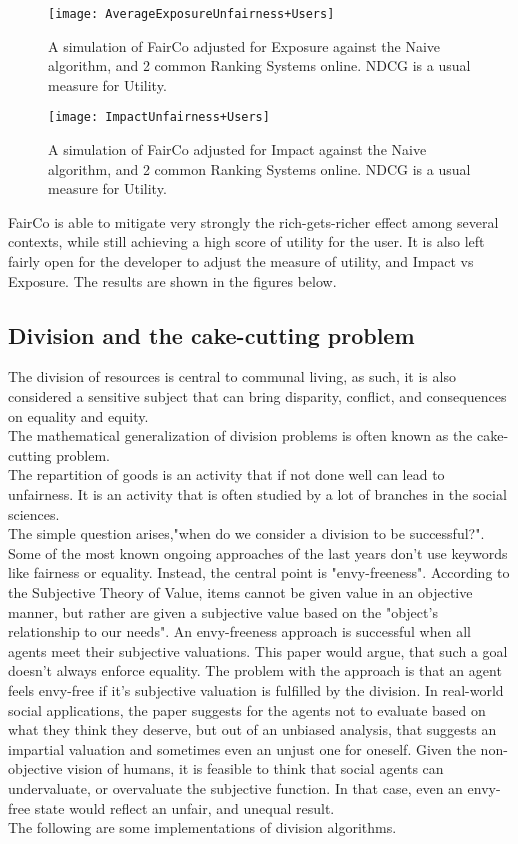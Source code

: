\begin{figure}[h]
  \texttt{[image: AverageExposureUnfairness+Users]}
  \caption{A simulation of FairCo adjusted for Exposure against the Naive algorithm, and 2 common Ranking Systems online. NDCG is a usual measure for Utility.}
  \cite{MSHJ20}
  \texttt{[image: ImpactUnfairness+Users]}
  \caption{A simulation of FairCo adjusted for Impact against the Naive algorithm, and 2 common Ranking Systems online. NDCG is a usual measure for Utility.}
  \cite{MSHJ20}
\end{figure}


FairCo is able to mitigate very strongly the rich-gets-richer effect among several contexts, while still achieving a high score of utility for the user. It is also left fairly open for the developer to  adjust the measure of utility, and Impact vs Exposure. The results are shown in the figures below.




\subsection{Division and the cake-cutting problem}
The division of resources is central to communal living, as such, it is also considered a sensitive subject that can bring disparity, conflict, and consequences on equality and equity.\\
The mathematical generalization of division problems is often known as the cake-cutting problem.\\
The repartition of goods is an activity that if not done well can lead to unfairness. It is an activity that is often studied by a lot of branches in the social sciences.\\
The simple question arises,"when do we consider a division to be successful?". Some of the most known ongoing approaches of the last years don't use keywords like fairness or equality. Instead, the central point is "envy-freeness". According to the Subjective Theory of Value, items cannot be given value in an objective manner, but rather are given a subjective value based on the "object's relationship to our needs"\cite{PrincEcon}. An envy-freeness approach is successful when all agents meet their subjective valuations. This paper would argue, that such a goal doesn't always enforce equality. The problem with the approach is that an agent feels envy-free if it's subjective valuation is fulfilled by the division. In real-world social applications, the paper suggests for the agents not to evaluate based on what they think they deserve, but out of an unbiased analysis, that suggests an impartial valuation and sometimes even an unjust one for oneself. Given the non-objective vision of humans, it is feasible to think that social agents can undervaluate, or overvaluate the subjective function. In that case, even an envy-free state would reflect an unfair, and unequal result.\\
The following are some implementations of division algorithms.
